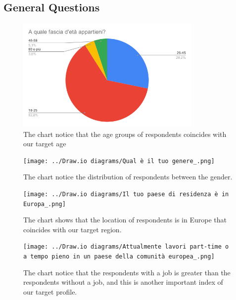 \subsection{General Questions}
\begin{figure}[htbp]
	\centering
	\includegraphics[width=0.8\textwidth]{../Draw.io diagrams/age_chart.png}  %
	\caption{The chart notice that the age groups of respondents coincides with our target age}
\end{figure}

\begin{figure}[htbp]
	\centering
	\texttt{[image: ../Draw.io diagrams/Qual è il tuo genere\_.png]}  %
	\caption{The chart notice the distribution of respondents between the gender.}
\end{figure}


\begin{figure}[htbp]
	\centering
	\texttt{[image: ../Draw.io diagrams/Il tuo paese di residenza è in Europa\_.png]}  %
	\caption{The chart shows that the location of respondents is in Europe that coincides with our target region.}
\end{figure}

\begin{figure}[htbp]
	\centering
	\texttt{[image: ../Draw.io diagrams/Attualmente lavori part-time o a tempo pieno in un paese della comunità europea\_.png]}  %
	\caption{The chart notice that the respondents with a job is greater than the respondents without a job, and this is another important index of our target profile.}
\end{figure}

